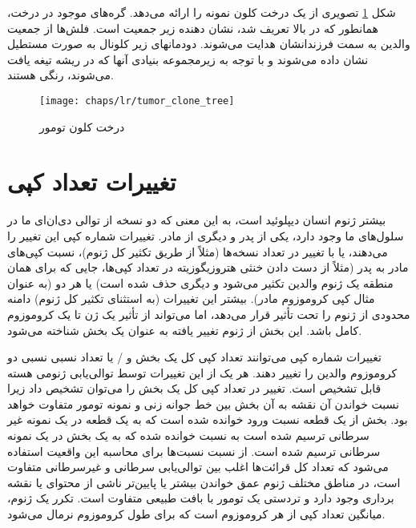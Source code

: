 شکل \ref{fig:ch_lr:tumor_clone_tree} تصویری از یک درخت کلون نمونه را ارائه می‌دهد. گره‌های موجود در درخت، همانطور که در بالا تعریف شد، نشان دهنده زیر جمعیت است. فلش‌ها از جمعیت والدین به سمت فرزندانشان هدایت می‌شوند. دودمانهای زیر کلونال به صورت مستطیل نشان داده می‌شوند و با توجه به زیرمجموعه بنیادی آنها که در ریشه تیغه یافت می‌شوند، رنگی هستند.


\begin{figure}[!ht]
	\centerline{\texttt{[image: chaps/lr/tumor\_clone\_tree]}}
	\caption{درخت کلون تومور}
	\label{fig:ch_lr:tumor_clone_tree}
\end{figure}




\section{تغییرات تعداد کپی }

بیشتر ژنوم انسان دیپلوئید است، به این معنی که دو نسخه از توالی دی‌ان‌ای ما در سلول‌های ما وجود دارد، یکی از پدر و دیگری از مادر. تغییرات شماره کپی این تغییر را می‌دهند، یا با تغییر در تعداد نسخه‌ها (مثلاً از طریق تکثیر کل ژنوم)، نسبت کپی‌های مادر به پدر (مثلاً از دست دادن خنثی هتروزیگوزیته در تعداد کپی‌ها، جایی که برای همان منطقه یک ژنوم والدین تکثیر می‌شود و دیگری حذف شده است) یا هر دو (به عنوان مثال کپی کروموزوم مادر). بیشتر این تغییرات (به استثنای تکثیر کل ژنوم) دامنه محدودی از ژنوم را تحت تأثیر قرار می‌دهد، اما می‌تواند از تأثیر یک ژن تا یک کروموزوم کامل باشد. این بخش از ژنوم تغییر یافته به عنوان یک بخش شناخته می‌شود.


تغییرات شماره کپی می‌توانند تعداد کپی کل یک بخش و / یا تعداد نسبی نسبی دو کروموزوم والدین را تغییر دهند. هر یک از این تغییرات توسط توالی‌یابی ژنومی هسته قابل تشخیص است. تغییر در تعداد کپی کل یک بخش را می‌توان تشخیص داد زیرا نسبت خواندن آن نقشه به آن بخش بین خط جوانه زنی و نمونه تومور متفاوت خواهد بود. بخش از یک قطعه نسبت ورود خوانده شده است که به یک قطعه در یک نمونه غیر سرطانی ترسیم شده است به نسبت خوانده شده که به یک بخش در یک نمونه سرطانی ترسیم شده است. از نسبت نسبت‌ها برای محاسبه این واقعیت استفاده می‌شود که تعداد کل قرائت‌ها اغلب بین توالی‌یابی سرطانی و غیرسرطانی متفاوت است، در مناطق مختلف ژنوم عمق خواندن بیشتر یا پایین‌تر ناشی از محتوای  یا نقشه برداری وجود دارد و تردستی یک تومور با بافت طبیعی متفاوت است. تکرر یک ژنوم، میانگین تعداد کپی از هر کروموزوم است که برای طول کروموزوم نرمال می‌شود.


